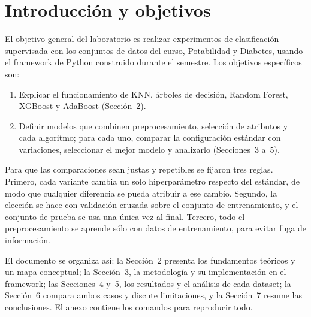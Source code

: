 \section{Introducción y objetivos}

El objetivo general del laboratorio es realizar experimentos de clasificación
supervisada con los conjuntos de datos del curso, Potabilidad y Diabetes, usando el
framework de Python construido durante el semestre. Los objetivos específicos son:

\begin{enumerate}
\item Explicar el funcionamiento de KNN, árboles de decisión, Random Forest,
XGBoost y AdaBoost (Sección~2).
\item Definir modelos que combinen preprocesamiento, selección de atributos y cada
algoritmo; para cada uno, comparar la configuración estándar con variaciones,
seleccionar el mejor modelo y analizarlo (Secciones~3 a~5).
\end{enumerate}

Para que las comparaciones sean justas y repetibles se fijaron tres reglas. Primero,
cada variante cambia un solo hiperparámetro respecto del estándar, de modo que
cualquier diferencia se pueda atribuir a ese cambio. Segundo, la elección se hace
con validación cruzada sobre el conjunto de entrenamiento, y el conjunto de prueba
se usa una única vez al final. Tercero, todo el preprocesamiento se aprende sólo
con datos de entrenamiento, para evitar fuga de información.

El documento se organiza así: la Sección~2 presenta los fundamentos teóricos y un
mapa conceptual; la Sección~3, la metodología y su implementación en el framework;
las Secciones~4 y~5, los resultados y el análisis de cada dataset; la Sección~6
compara ambos casos y discute limitaciones, y la Sección~7 resume las conclusiones.
El anexo contiene los comandos para reproducir todo.
